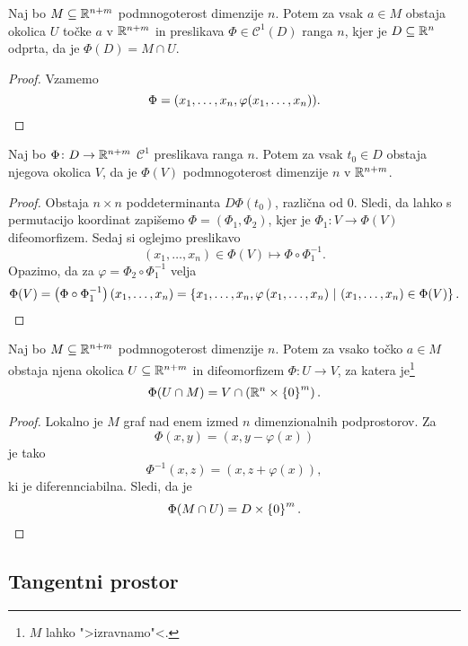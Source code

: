 \begin{trditev}
Naj bo $M \subseteq \mathbb{R}^{n+m}$ podmnogoterost dimenzije $n$. Potem
za vsak $a \in M$ obstaja okolica $U$ točke $a$ v $\mathbb{R}^{n+m}$ in
preslikava $\Phi \in \mathcal{C}^1(D)$ ranga $n$, kjer je
$D \subseteq \mathbb{R}^n$ odprta, da je $\Phi(D) = M \cap U$.
\end{trditev}

\begin{proof}
Vzamemo
\[
\Phi = (x_1, \dots, x_n, \varphi(x_1, \dots, x_n)). \qedhere
\]
\end{proof}

\begin{trditev}
Naj bo $\Phi \colon D \to \mathbb{R}^{n+m}$ $\mathcal{C}^1$ preslikava
ranga $n$. Potem za vsak $t_0 \in D$ obstaja njegova okolica $V$,
da je $\Phi(V)$ podmnogoterost dimenzije $n$ v $\mathbb{R}^{n+m}$.
\end{trditev}


\begin{proof}
Obstaja $n \times n$ poddeterminanta $D\Phi(t_0)$, različna od $0$.
Sledi, da lahko s permutacijo koordinat zapišemo
$\Phi = (\Phi_1, \Phi_2)$, kjer je $\Phi_1 \colon V \to \Phi(V)$
difeomorfizem. Sedaj si oglejmo preslikavo
\[
(x_1, \dots, x_n) \in \Phi(V) \mapsto \Phi \circ \Phi_1^{-1}.
\]
Opazimo, da za $\varphi = \Phi_2 \circ \Phi_1^{-1}$ velja
\[
\Phi(V) =
\left(\Phi \circ \Phi_1^{-1}\right)(x_1, \dots, x_n) =
\left\{x_1, \dots, x_n, \varphi\left(x_1, \dots, x_n\right)~\middle\vert~(x_1, \dots, x_n) \in \Phi(V)\right\}. \qedhere
\]
\end{proof}

\begin{trditev}
Naj bo $M \subseteq \mathbb{R}^{n+m}$ podmnogoterost dimenzije $n$. Potem
za vsako točko $a \in M$ obstaja njena okolica
$U \subseteq \mathbb{R}^{n+m}$ in difeomorfizem $\Phi \colon U \to V$, za
katera je\footnote{$M$ lahko ">izravnamo"<.}
\[
\Phi(U \cap M) = V \cap \left(\mathbb{R}^n \times \left\{0\right\}^m\right).
\]
\end{trditev}

\begin{proof}
Lokalno je $M$ graf nad enem izmed $n$ dimenzionalnih podprostorov.
Za
\[
\Phi(x,y) = (x, y - \varphi(x))
\]
je tako
\[
\Phi^{-1}(x,z) = (x, z + \varphi(x)),
\]
ki je diferennciabilna. Sledi, da je
\[
\Phi(M \cap U) = D \times \left\{0\right\}^m. \qedhere
\]
\end{proof}

\newpage

\subsection{Tangentni prostor}

